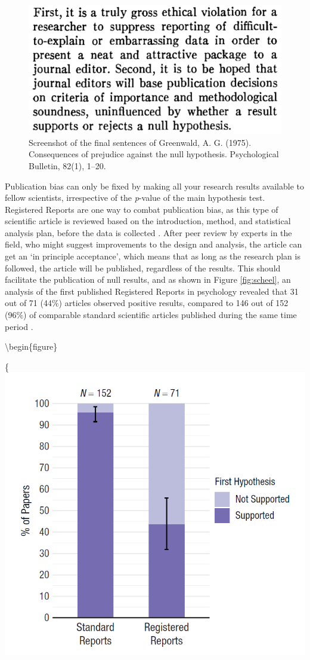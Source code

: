 \documentclass[
  oneside]{book}
\begin{document}
\begin{figure}

{\centering \includegraphics[width=1\linewidth]{images/greenwald} 

}

\caption{Screenshot of the final sentences of Greenwald, A. G. (1975). Consequences of prejudice against the null hypothesis. Psychological Bulletin, 82(1), 1–20.}\label{fig:greenwald}
\end{figure}

Publication bias can only be fixed by making all your research results available to fellow scientists, irrespective of the \emph{p}-value of the main hypothesis test. Registered Reports are one way to combat publication bias, as this type of scientific article is reviewed based on the introduction, method, and statistical analysis plan, before the data is collected \citep{chambers_past_2022, nosek_registered_2014}. After peer review by experts in the field, who might suggest improvements to the design and analysis, the article can get an `in principle acceptance', which means that as long as the research plan is followed, the article will be published, regardless of the results. This should facilitate the publication of null results, and as shown in Figure \ref{fig:scheel}, an analysis of the first published Registered Reports in psychology revealed that 31 out of 71 (44\%) articles observed positive results, compared to 146 out of 152 (96\%) of comparable standard scientific articles published during the same time period \citep{scheel_excess_2021}.

\textbackslash begin\{figure\}

\{\centering \includegraphics[width=0.75\linewidth]{images/scheel}
\end{document}
